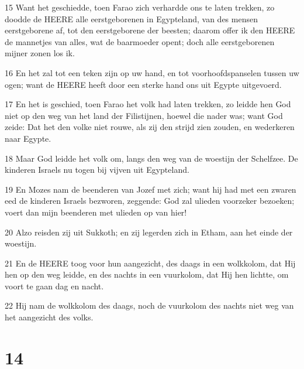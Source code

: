 \par 15 Want het geschiedde, toen Farao zich verhardde ons te laten trekken, zo doodde de HEERE alle eerstgeborenen in Egypteland, van des mensen eerstgeborene af, tot den eerstgeborene der beesten; daarom offer ik den HEERE de mannetjes van alles, wat de baarmoeder opent; doch alle eerstgeborenen mijner zonen los ik.
\par 16 En het zal tot een teken zijn op uw hand, en tot voorhoofdspanselen tussen uw ogen; want de HEERE heeft door een sterke hand ons uit Egypte uitgevoerd.
\par 17 En het is geschied, toen Farao het volk had laten trekken, zo leidde hen God niet op den weg van het land der Filistijnen, hoewel die nader was; want God zeide: Dat het den volke niet rouwe, als zij den strijd zien zouden, en wederkeren naar Egypte.
\par 18 Maar God leidde het volk om, langs den weg van de woestijn der Schelfzee. De kinderen Israels nu togen bij vijven uit Egypteland.
\par 19 En Mozes nam de beenderen van Jozef met zich; want hij had met een zwaren eed de kinderen Israels bezworen, zeggende: God zal ulieden voorzeker bezoeken; voert dan mijn beenderen met ulieden op van hier!
\par 20 Alzo reisden zij uit Sukkoth; en zij legerden zich in Etham, aan het einde der woestijn.
\par 21 En de HEERE toog voor hun aangezicht, des daags in een wolkkolom, dat Hij hen op den weg leidde, en des nachts in een vuurkolom, dat Hij hen lichtte, om voort te gaan dag en nacht.
\par 22 Hij nam de wolkkolom des daags, noch de vuurkolom des nachts niet weg van het aangezicht des volks.

\chapter{14}

